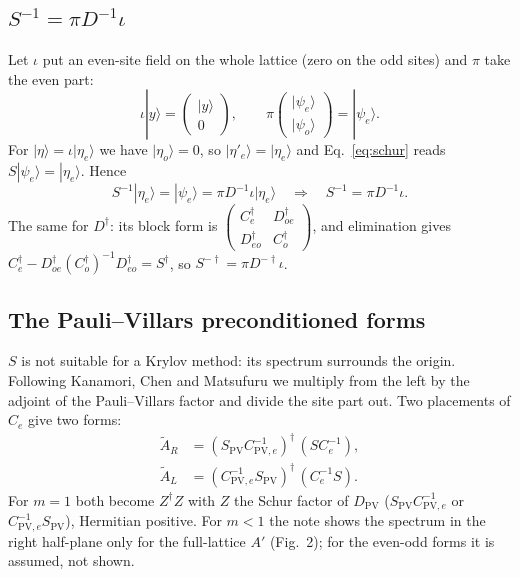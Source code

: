 \documentclass[11pt,a4paper]{article}
\numberwithin{equation}{section}
\newcommand{\dg}{^{\dagger}}
\newcommand{\Dpv}{D_{\mathrm{PV}}}
\newcommand{\Spv}{S_{\mathrm{PV}}}
\newcommand{\AR}{\tilde A_{R}}
\newcommand{\AL}{\tilde A_{L}}
\newcommand{\Ce}{C_{e}}
\newcommand{\Co}{C_{o}}
\newcommand{\Cpve}{C_{\mathrm{PV},e}}
\begin{document}
\subsection{$S^{-1}=\pi D^{-1}\iota$}
\label{sec:Sinv}
Let $\iota$ put an even-site field on the whole lattice (zero on the odd sites) and $\pi$ take
the even part:
\begin{equation}
\iota|y\rangle=\begin{pmatrix}|y\rangle\\0\end{pmatrix},\qquad
\pi\begin{pmatrix}|\psi_e\rangle\\|\psi_o\rangle\end{pmatrix}=|\psi_e\rangle .
\end{equation}
For $|\eta\rangle=\iota|\eta_e\rangle$ we have $|\eta_o\rangle=0$, so $|\eta'_e\rangle=|\eta_e\rangle$
and Eq.~\eqref{eq:schur} reads $S|\psi_e\rangle=|\eta_e\rangle$. Hence
\begin{equation}
S^{-1}|\eta_e\rangle=|\psi_e\rangle=\pi D^{-1}\iota|\eta_e\rangle\quad\Longrightarrow\quad S^{-1}=\pi D^{-1}\iota .
\label{eq:Sinv}
\end{equation}
The same for $D\dg$: its block form is $\begin{pmatrix}\Ce\dg & D_{oe}\dg\\ D_{eo}\dg & \Co\dg\end{pmatrix}$,
and elimination gives $\Ce\dg-D_{oe}\dg(\Co\dg)^{-1}D_{eo}\dg=S\dg$, so $S^{-\dagger}=\pi D^{-\dagger}\iota$.

\subsection{The Pauli--Villars preconditioned forms}
\label{sec:pvforms}
$S$ is not suitable for a Krylov method: its spectrum surrounds the origin. Following Kanamori,
Chen and Matsufuru we multiply from the left by the adjoint of the Pauli--Villars factor and
divide the site part out. Two placements of $\Ce$ give two forms:
\begin{align}
\AR&=(\Spv\Cpve^{-1})\dg\,(S\Ce^{-1}),\nonumber\\
\AL&=(\Cpve^{-1}\Spv)\dg\,(\Ce^{-1}S).
\end{align}
For $m=1$ both become $Z\dg Z$ with $Z$ the Schur factor of $\Dpv$ ($\Spv\Cpve^{-1}$ or
$\Cpve^{-1}\Spv$), Hermitian positive. For $m<1$ the note shows the spectrum in the right
half-plane only for the full-lattice $A'$ (Fig.~2); for the even-odd forms it is assumed, not
shown.
\end{document}
